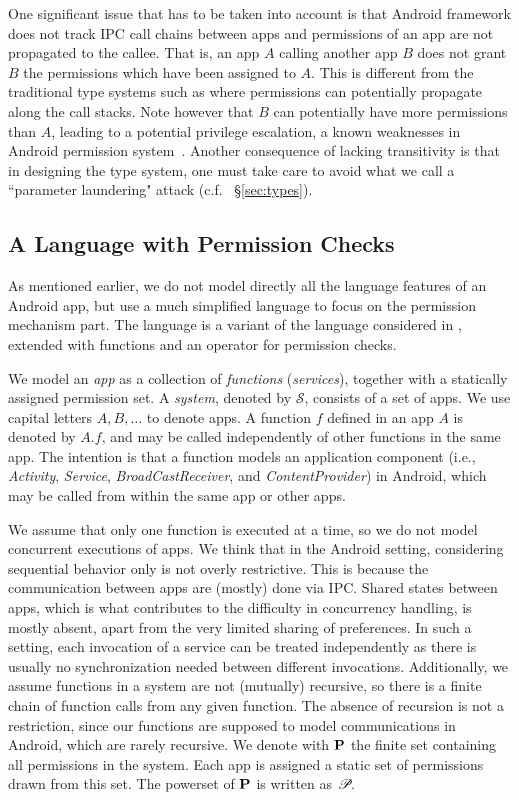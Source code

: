 One significant issue that has to be taken into account is that Android framework does not track IPC call chains between apps and permissions of an app are not propagated to the callee. That is, an app $A$ calling another app $B$ does not grant $B$ the permissions which have been assigned to $A$. This is different from the traditional type systems such as {\BN} where permissions can potentially propagate along the call stacks. Note however that $B$ can potentially have more permissions than $A$, leading to a potential privilege escalation, a known weaknesses in Android permission system~\cite{Chin:2011wa}. Another consequence of lacking transitivity is that in designing the type system, one must take care to avoid what we call a ``parameter laundering" attack (c.f. ~\S\ref{sec:types}).

\subsection{A Language with Permission Checks}\label{sec:language}

As mentioned earlier, we do not model directly all the language features of an Android app, but use a much simplified language to focus on the permission mechanism part. The language is a variant of the  language considered in \cite{Volpano:1996}, extended with functions and an operator for permission checks.

We model an \emph{app} as a collection of \emph{functions}
(\emph{services}), together with a statically assigned permission
set. A \emph{system}, denoted by $\mathcal{S}$, consists of a set of
apps. We use capital letters $A,B,\ldots$ to denote apps. A function
$f$ defined in an app $A$ is denoted by $A.f$, and may be called
independently of other functions in the same app. The intention is
that a function models an  application component (i.e.,
\emph{Activity}, \emph{Service}, \emph{BroadCastReceiver}, and
\emph{ContentProvider}) in Android, which may be called from within
the same app or other apps.

We assume that only one function is
executed at a time, so we do not model concurrent executions of
apps. We think that in the Android setting, considering sequential behavior only is
not overly restrictive. This is because the communication between apps are
(mostly) done via IPC. Shared states between apps,
which is what contributes to the difficulty in concurrency handling, is mostly
absent, apart from the very limited sharing of preferences. In such a setting,
each invocation of a service can be treated independently as there is usually
no synchronization needed between different invocations. Additionally, we assume functions in a system are not (mutually)
recursive, so there is a finite chain of function calls from any given
function. The absence of recursion is not a restriction, since our
functions are supposed to model communications in Android, which are
rarely recursive. We denote with $\mathbf{P}$ the finite set containing all permissions in
the system. Each app is assigned a static set of permissions drawn
from this set. The powerset of $\mathbf{P}$ is written as~$\!\mathscr{P}\!$.  


